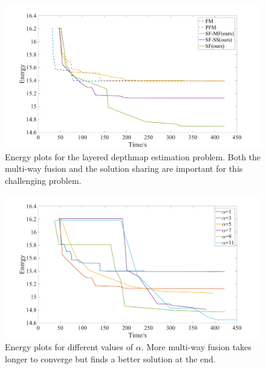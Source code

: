 \begin{figure}[tb]
  \includegraphics[width=\columnwidth]{figure/layered_depthmap_convergence.png}
  \caption{Energy plots for the layered depthmap estimation
 problem. Both the multi-way fusion and the solution sharing are important
 for this challenging problem.}\label{fig:layered_depthmap_convergence}
\end{figure}
\begin{figure}[tb]
  \includegraphics[width=\columnwidth]{figure/layered_depthmap_by_alpha.png}
 \caption{Energy plots for different values of $\alpha$.
 More multi-way fusion takes longer to converge but finds a better
 solution at the end.}\label{fig:layered_depthmap_by_alpha}
\end{figure}

